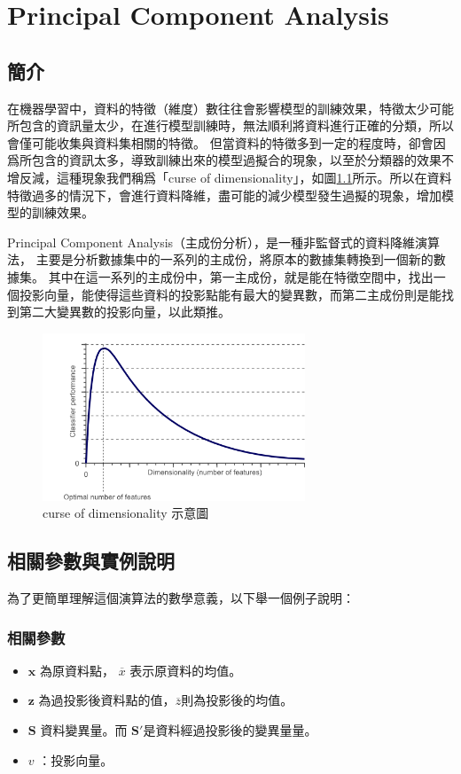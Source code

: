\chapter{Principal Component Analysis}
\label{chapter:pca}
\section{簡介}
\label{sec:introduction}


在機器學習中，資料的特徵（維度）數往往會影響模型的訓練效果，特徵太少可能所包含的資訊量太少，在進行模型訓練時，無法順利將資料進行正確的分類，所以會僅可能收集與資料集相關的特徵。
但當資料的特徵多到一定的程度時，卻會因爲所包含的資訊太多，導致訓練出來的模型過擬合的現象，以至於分類器的效果不增反減，這種現象我們稱爲「curse of dimensionality」，如圖\ref{fig:CurseOfDimesionality}所示。所以在資料特徵過多的情況下，會進行資料降維，盡可能的減少模型發生過擬的現象，增加模型的訓練效果。

Principal Component Analysis（主成份分析），是一種非監督式的資料降維演算法，
主要是分析數據集中的一系列的主成份，將原本的數據集轉換到一個新的數據集。
其中在這一系列的主成份中，第一主成份，就是能在特徵空間中，找出一個投影向量，能使得這些資料的投影點能有最大的變異數，而第二主成份則是能找到第二大變異數的投影向量，以此類推。




\begin{figure}[h]
	\centering
	\includegraphics[height=5cm]{./pic/NZgacRXF.png}
	\caption{curse of dimensionality 示意圖}
	\label{fig:CurseOfDimesionality}
\end{figure}

\section{相關參數與實例說明}
為了更簡單理解這個演算法的數學意義，以下舉一個例子說明：

\subsection{相關參數}
\begin{itemize}
	\item
		\(\mathbf{x}\) 為原資料點， \(\overline{x}\) 表示原資料的均值。
	\item
	     \(\mathbf{z}\) 為過投影後資料點的值，\(\overline{z}\)則為投影後的均值。 
	\item
	      \(\mathbf{S}\) 資料變異量。而 \(\mathbf{{S}'}\)是資料經過投影後的變異量量。
	\item
	      \(v\) ：投影向量。
\end{itemize}


